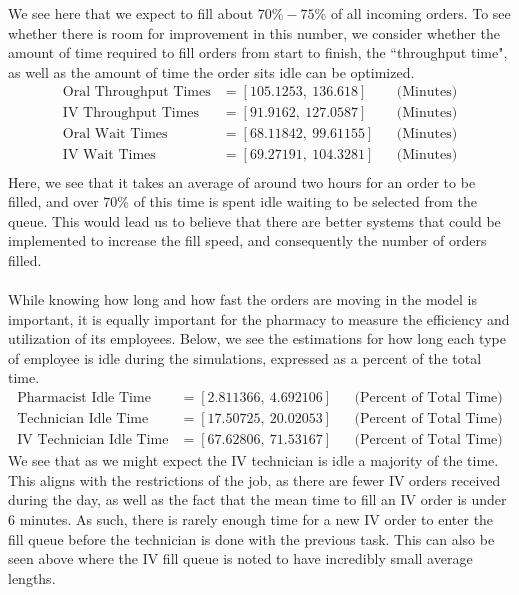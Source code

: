 \documentclass[10pt]{report}            %
\begin{document}
We see here that we expect to fill about $70\%-75\%$ of all incoming orders. To see whether there is room for improvement in this number, we consider whether the amount of time required to fill orders from start to finish, the ``throughput time", as well as the amount of time the order sits idle can be optimized.
\begin{align*}
\text{Oral Throughput Times} &= [105.1253,\ 136.618] && \text{(Minutes)}\\
\text{IV Throughput Times} &= [91.9162,\ 127.0587] && \text{(Minutes)}\\
\text{Oral Wait Times} &= [68.11842,\ 99.61155] && \text{(Minutes)}\\
\text{IV Wait Times} &= [69.27191,\ 104.3281] && \text{(Minutes)}\\
\end{align*}
Here, we see that it takes an average of around two hours for an order to be filled, and over $70\%$ of this time is spent idle waiting to be selected from the queue. This would lead us to believe that there are better systems that could be implemented to increase the fill speed, and consequently the number of orders filled.\\\hfill\\
While knowing how long and how fast the orders are moving in the model is important, it is equally important for the pharmacy to measure the efficiency and utilization of its employees. Below, we see the estimations for how long each type of employee is idle during the simulations, expressed as a percent of the total time.
\begin{align*}
\text{Pharmacist Idle Time} &= [2.811366,\ 4.692106] && \text{(Percent of Total Time)}\\
\text{Technician Idle Time} &= [17.50725,\ 20.02053] && \text{(Percent of Total Time)}\\
\text{IV Technician Idle Time} &= [67.62806,\ 71.53167] && \text{(Percent of Total Time)}
\end{align*}
We see that as we might expect the IV technician is idle a majority of the time. This aligns with the restrictions of the job, as there are fewer IV orders received during the day, as well as the fact that the mean time to fill an IV order is under $6$ minutes. As such, there is rarely enough time for a new IV order to enter the fill queue before the technician is done with the previous task. This can also be seen above where the IV fill queue is noted to have incredibly small average lengths.\\\hfill\\
\end{document}
